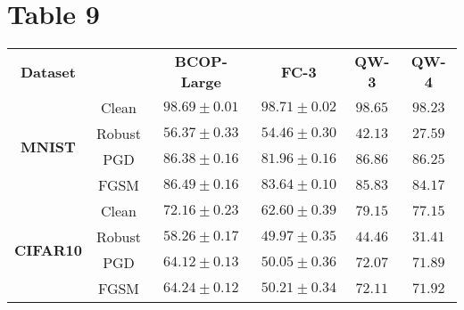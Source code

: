 \documentclass{article}%
\begin{document}
%
\section*{Table 9}%
\label{sec:Table9}%
\begin{tabularx}{\textwidth}{c|c|cccc}%
\textbf{Dataset}&&\textbf{BCOP-Large}&\textbf{FC-3}&\textbf{QW-3}&\textbf{QW-4}\\%
\cmidrule{1-6}%
\multirow{4}{*}{\textbf{{MNIST}}}&Clean&$98.69\pm0.01$&$\mathbf{98.71}\pm0.02$&$98.65$&$98.23$\\%
&Robust&$\mathbf{56.37}\pm0.33$&$54.46\pm0.30$&$42.13$&$27.59$\\%
&PGD&$86.38\pm0.16$&$81.96\pm0.16$&$\mathbf{86.86}$&$86.25$\\%
&FGSM&$\mathbf{86.49}\pm0.16$&$83.64\pm0.10$&$85.83$&$84.17$\\%
\cmidrule{1-6}%
\multirow{4}{*}{\textbf{{CIFAR10}}}&Clean&$72.16\pm0.23$&$62.60\pm0.39$&$\mathbf{79.15}$&$77.15$\\%
&Robust&$\mathbf{58.26}\pm0.17$&$49.97\pm0.35$&$44.46$&$31.41$\\%
&PGD&$64.12\pm0.13$&$50.05\pm0.36$&$\mathbf{72.07}$&$71.89$\\%
&FGSM&$64.24\pm0.12$&$50.21\pm0.34$&$\mathbf{72.11}$&$71.92$\\%
\cmidrule{1-6}%
\end{tabularx}

%
\end{document}
